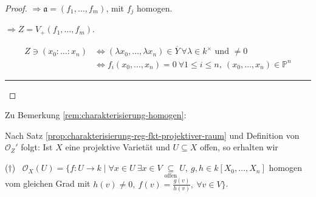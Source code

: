 \begin{proof}
  $\Rightarrow\mathfrak{a}=(f_{1},\ldots,f_{m})$, mit $f_{j}$ homogen.

  $\Rightarrow Z=V_{+}(f_{1},\ldots,f_{m})$. 

  \begin{align*}
    Z\ni(x_{0}:\ldots:x_{n}) & \Leftrightarrow(\lambda x_{0},\ldots,\lambda x_{n})\in\overline{Y}\ \forall\lambda\in k^{\times}\text{ und }\neq0\\
                             & \Leftrightarrow f_{i}(x_{0},\ldots,x_{n})=0\ \forall1\leq i\leq n,\ (x_{0},\ldots,x_{n})\in\mathbb{P}^{n}
  \end{align*}

  \rule[0.5ex]{1\columnwidth}{1pt}
\end{proof}
Zu Bemerkung \ref{rem:charakterisierung-homogen}:

Nach Satz \ref{prop:charakterisierung-reg-fkt-projektiver-raum} und Definition von $\mathcal{O}_{Z}'$ folgt: Ist $X$
eine projektive Varietät und $U\subseteq X$ offen, so erhalten wir 


($\dagger$) \ $\mathcal{O}_{X}(U)=\{f:U\rightarrow k\mid\forall x\in U\ \exists x\in V\underset{\text{offen}}{\subseteq}U,\ g,h\in k[X_{0},\ldots,X_{n}]$
homogen vom gleichen Grad mit $h(v)\neq0, \ f(v)=\frac{g(v)}{h(v)},\ \forall v\in V\}$.


